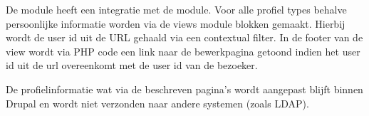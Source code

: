 De  module heeft een integratie met de  module. Voor alle profiel types behalve persoonlijke informatie worden via de views module blokken gemaakt. Hierbij wordt de user id uit de URL gehaald via een contextual filter. In de footer van de view wordt via PHP code een link naar de bewerkpagina getoond indien het user id uit de url overeenkomt met de user id van de bezoeker.

De profielinformatie wat via de beschreven pagina's wordt aangepast blijft binnen Drupal en wordt niet verzonden naar andere systemen (zoals LDAP).